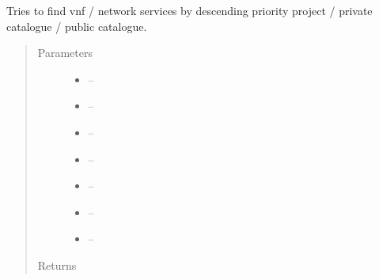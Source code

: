 \documentclass[letterpaper,10pt,english]{sphinxmanual}
\begin{document}
\begin{fulllineitems}
\label{_source/son_editor.impl:son_editor.impl.nsfslookupimpl.find_by_priority}
Tries to find vnf / network services by descending priority project / private catalogue / public catalogue.
\begin{quote}\begin{description}
\item[{Parameters}] \leavevmode\begin{itemize}
\item {} 
 -- 

\item {} 
 -- 

\item {} 
 -- 

\item {} 
 -- 

\item {} 
 -- 

\item {} 
 -- 

\item {} 
 -- 

\end{itemize}

\item[{Returns}] \leavevmode


\end{description}\end{quote}

\end{fulllineitems}

\end{document}
